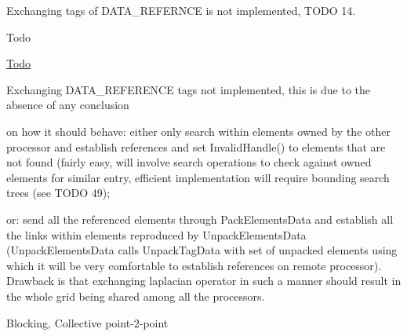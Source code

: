 Exchanging tags of D\-A\-T\-A\-\_\-\-R\-E\-F\-E\-R\-N\-C\-E is not implemented, T\-O\-D\-O 14. \begin{DoxyRefDesc}{Todo}
\item[\hyperlink{todo__todo000013}{Todo}]
\begin{DoxyEnumerate}
\item Exchanging D\-A\-T\-A\-\_\-\-R\-E\-F\-E\-R\-E\-N\-C\-E tags not implemented, this is due to the absence of any conclusion
\end{DoxyEnumerate}
\begin{DoxyItemize}
\item on how it should behave\-: either only search within elements owned by the other processor and establish references and set Invalid\-Handle() to elements that are not found (fairly easy, will involve search operations to check against owned elements for similar entry, efficient implementation will require bounding search trees (see T\-O\-D\-O 49);
\item or\-: send all the referenced elements through Pack\-Elements\-Data and establish all the links within elements reproduced by Unpack\-Elements\-Data (Unpack\-Elements\-Data calls Unpack\-Tag\-Data with set of unpacked elements using which it will be very comfortable to establish references on remote processor). Drawback is that exchanging laplacian operator in such a manner should result in the whole grid being shared among all the processors.
\end{DoxyItemize}\end{DoxyRefDesc}


Blocking, Collective point-\/2-\/point


